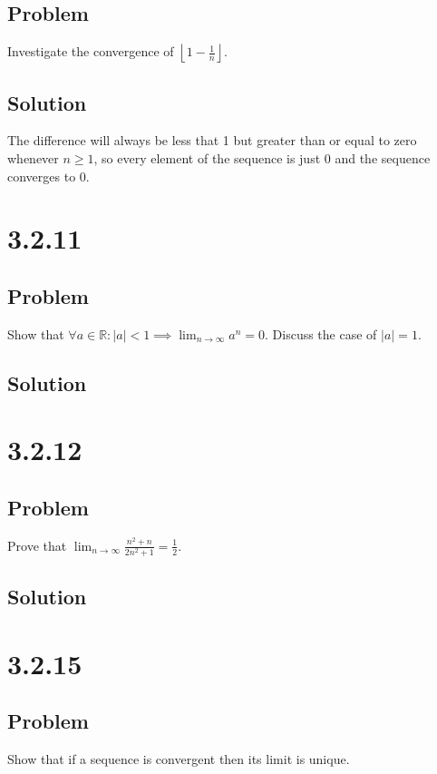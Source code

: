 \documentclass[12pt]{article}
\newcommand{\abs}  [1]{\left|       #1 \right|      }
\newcommand{\floor}[1]{\left\lfloor #1 \right\rfloor}
\newcommand{\R}    [0]{\mathbb{R}                   }
\begin{document}
\subsection*{Problem}
Investigate the convergence of $\floor{1 - \frac{1}{n}}$.

\subsection*{Solution}
The difference will always be less that 1 but greater than or equal to zero whenever $n \geq 1$, so every element of the sequence is just 0 and the sequence converges to 0.



\section*{3.2.11}

\subsection*{Problem}
Show that $\forall a \in \R : \abs{a} < 1 \implies \lim_{n \to \infty} a^n = 0$. Discuss the case of $\abs{a} = 1$.

\subsection*{Solution}




\section*{3.2.12}

\subsection*{Problem}
Prove that $\lim_{n \to \infty} \frac{n^2 + n}{2n^2 + 1} = \frac{1}{2}$.

\subsection*{Solution}




\section*{3.2.15}

\subsection*{Problem}
Show that if a sequence is convergent then its limit is unique.
\end{document}
